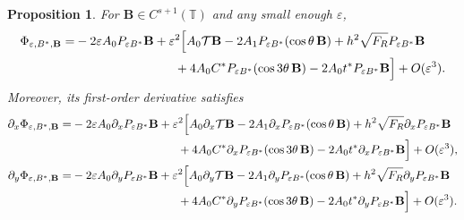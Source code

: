 \documentclass[12pt,reqno]{amsart}
\numberwithin{equation}{section}
\newtheorem{proposition}[theorem]{Proposition}
\theoremstyle{definition}
\theoremstyle{remark}
\begin{document}
\begin{proposition}\label{prop:variation}
	For $ \textbf{B} \in C^{s+1}(\mathbb{T})$ and any small enough $\varepsilon$,
\begin{equation*} 
\begin{split}
\Phi_{\varepsilon,B^*,\mathbf{B}} =& -2\varepsilon A_0 P_{\varepsilon B^*} \textbf{B}+ \varepsilon^2 \Bigl[ A_0\mathcal{T} \textbf{B}
-2A_1P_{\varepsilon B^*}(\cos\theta\, \textbf{B}) +h^2\sqrt{F_R}P_{\varepsilon B^*}  \textbf{B}\\
&\hspace{8em}
 +4A_0C^*P_{\varepsilon B^*}(\cos3\theta\, \textbf{B})-2A_0t^*P_{\varepsilon B^*} \textbf{B} \Bigr]
+ O(\varepsilon^3) .
\end{split}
\end{equation*}
Moreover, its first-order derivative   satisfies
\begin{align*} 
\partial_x\Phi_{\varepsilon,B^*, \textbf{B}}
=&-2\varepsilon A_0\partial_xP_{\varepsilon B^*}  \textbf{B}
+\varepsilon^2\Big[A_0\partial_x\mathcal{T} \textbf{B}-2A_1\partial_xP_{\varepsilon B^*}(  \cos\theta\, \textbf{B}) +h^2\sqrt{F_R}\partial_xP_{\varepsilon B^*}  \textbf{B}\\
&\hspace{9em}
+4A_0C^*\partial_xP_{\varepsilon B^*}(\cos3\theta\, \textbf{B})-2A_0t^*\partial_xP_{\varepsilon B^*} \textbf{B} \Bigr]
+ O(\varepsilon^3),\notag\\
\partial_y\Phi_{\varepsilon,B^*, \textbf{B}}
=&-2\varepsilon A_0\partial_yP_{\varepsilon B^*}  \textbf{B}
+\varepsilon^2\Big[A_0\partial_y\mathcal{T} \textbf{B}-2A_1\partial_yP_{\varepsilon B^*}(  \cos\theta\, \textbf{B}) +h^2\sqrt{F_R}\partial_yP_{\varepsilon B^*}  \textbf{B}\\
&\hspace{9em}
+4A_0C^*\partial_yP_{\varepsilon B^*}(\cos3\theta\, \textbf{B})-2A_0t^*\partial_yP_{\varepsilon B^*} \textbf{B} \Bigr]
+ O(\varepsilon^3).\notag 
\end{align*}

\end{proposition} 
\end{document}
